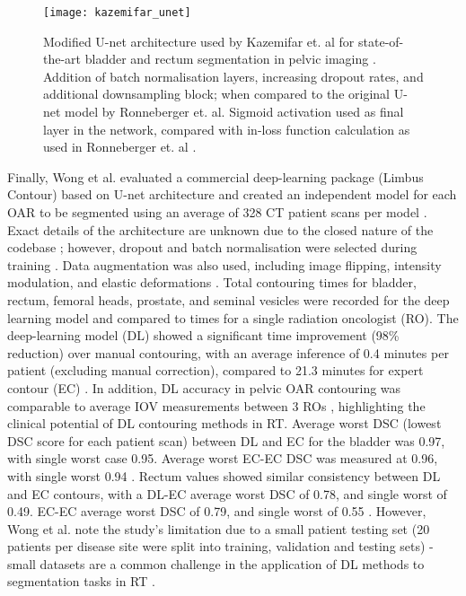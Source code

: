 \begin{figure}
	\begin{center}
		\texttt{[image: kazemifar\_unet]}
		\caption{Modified U-net architecture used by Kazemifar et. al for state-of-the-art bladder and rectum segmentation in pelvic imaging \cite{Kazemifar_2018}. Addition of batch normalisation layers, increasing dropout rates, and additional downsampling block; when compared to the original U-net model by Ronneberger et. al. Sigmoid activation used as final layer in the network, compared with in-loss function calculation as used in Ronneberger et. al \cite{Ronneberger_2015}.}
		\label{fig:kazemifar_unet}
	\end{center}
\end{figure}

Finally, Wong et al. evaluated a commercial deep-learning package (Limbus Contour) based on U-net architecture and created an independent model for each OAR to be segmented using an average of 328 CT patient scans per model \cite{Wong2020}. Exact details of the architecture are unknown due to the closed nature of the codebase \cite{Wong2020}; however, dropout and batch normalisation were selected during training \cite{Wong2020}. Data augmentation was also used, including image flipping, intensity modulation, and elastic deformations \cite{Wong2020}. Total contouring times for bladder, rectum, femoral heads, prostate, and seminal vesicles were recorded for the deep learning model and compared to times for a single radiation oncologist (RO). The deep-learning model (DL) showed a significant time improvement (98\% reduction) over manual contouring, with an average inference of 0.4 minutes per patient (excluding manual correction), compared to 21.3 minutes for expert contour (EC) \cite{Wong2020}. In addition, DL accuracy in pelvic OAR contouring was comparable to average IOV measurements between 3 ROs \cite{Wong2020}, highlighting the clinical potential of DL contouring methods in RT. Average worst DSC (lowest DSC score for each patient scan) between DL and EC for the bladder was 0.97, with single worst case 0.95. Average worst EC-EC DSC was measured at 0.96, with single worst 0.94 \cite{Wong2020}. Rectum values showed similar consistency between DL and EC contours, with a DL-EC average worst DSC of 0.78, and single worst of 0.49. EC-EC average worst DSC of 0.79, and single worst of 0.55 \cite{Wong2020}. However, Wong et al. note the study's limitation due to a small patient testing set (20 patients  per disease site were split into training, validation and testing sets) \cite{Wong2020} - small datasets are a common challenge in the application of DL methods to segmentation tasks in RT \cite{Ronneberger_2015, Maier2019, Hesamian2019, Lundervold2019}.
%

